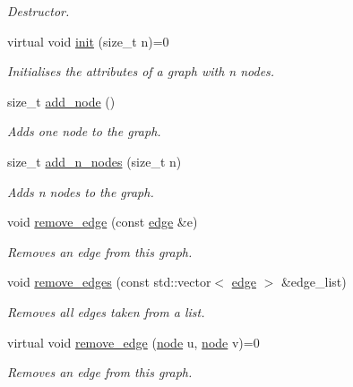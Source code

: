 \begin{DoxyCompactItemize}
\begin{DoxyCompactList}\small\item\em Destructor. \end{DoxyCompactList}\item 
virtual void \hyperlink{classlgraph_1_1xxgraph_aba97900b2d33e1bb0d31594cf169f0ba}{init} (size\-\_\-t n)=0
\begin{DoxyCompactList}\small\item\em Initialises the attributes of a graph with {\itshape n} nodes. \end{DoxyCompactList}\item 
size\-\_\-t \hyperlink{classlgraph_1_1xxgraph_a6cb21d5e52afbb438a3e6643998c40cf}{add\-\_\-node} ()
\begin{DoxyCompactList}\small\item\em Adds one node to the graph. \end{DoxyCompactList}\item 
size\-\_\-t \hyperlink{classlgraph_1_1xxgraph_a8dd24aa48d55dfceaa87e47c32ae914a}{add\-\_\-n\-\_\-nodes} (size\-\_\-t n)
\begin{DoxyCompactList}\small\item\em Adds {\itshape n} nodes to the graph. \end{DoxyCompactList}\item 
void \hyperlink{classlgraph_1_1xxgraph_a46a75fa2a10a8674ab930e9dc766e2f9}{remove\-\_\-edge} (const \hyperlink{namespacelgraph_a76bd7d50719f03de7a85db259d80d572}{edge} \&e)
\begin{DoxyCompactList}\small\item\em Removes an edge from this graph. \end{DoxyCompactList}\item 
void \hyperlink{classlgraph_1_1xxgraph_aef7c4bf62f3f4db362b2d3accb3b6d3d}{remove\-\_\-edges} (const std\-::vector$<$ \hyperlink{namespacelgraph_a76bd7d50719f03de7a85db259d80d572}{edge} $>$ \&edge\-\_\-list)
\begin{DoxyCompactList}\small\item\em Removes all edges taken from a list. \end{DoxyCompactList}\item 
virtual void \hyperlink{classlgraph_1_1xxgraph_a7fd3a1309cde4f408c8d9d4cb3b898a8}{remove\-\_\-edge} (\hyperlink{namespacelgraph_a397169dd66adf725210a30fb7251773e}{node} u, \hyperlink{namespacelgraph_a397169dd66adf725210a30fb7251773e}{node} v)=0
\begin{DoxyCompactList}\small\item\em Removes an edge from this graph. \end{DoxyCompactList}\item 

\end{DoxyCompactItemize}
